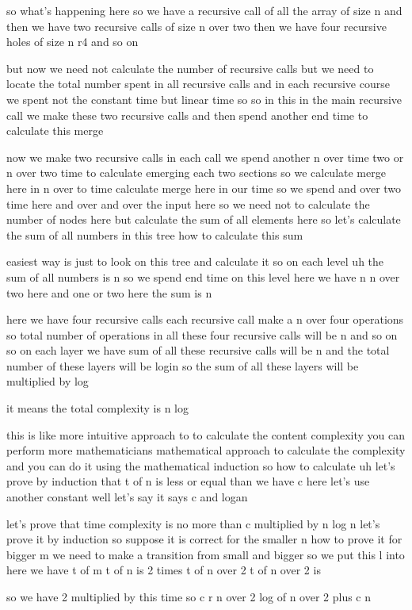 so what's happening here so we have a recursive call of all the array of size n and then we have two recursive calls of size n over two then we have four recursive holes of size n r4 and so on

but now we need not calculate the number of recursive calls but we need to locate the total number spent in all recursive calls and in each recursive course we spent not the constant time but linear time so so in this in the main recursive call we make these two recursive calls and then spend another end time to calculate this merge

now we make two recursive calls in each call we spend another n over time two or n over two time to calculate emerging each two sections so we calculate merge here in n over to time calculate merge here in our time so we spend and over two time here and over and over the input here so we need not to calculate the number of nodes here but calculate the sum of all elements here so let's calculate the sum of all numbers in this tree how to calculate this sum

easiest way is just to look on this tree and calculate it so on each level uh the sum of all numbers is n so we spend end time on this level here we have n n over two here and one or two here the sum is n

here we have four recursive calls each recursive call make a n over four operations so total number of operations in all these four recursive calls will be n and so on so on each layer we have sum of all these recursive calls will be n and the total number of these layers will be login so the sum of all these layers will be multiplied by log

it means the total complexity is n log

this is like more intuitive approach to to calculate the content complexity you can perform more mathematicians mathematical approach to calculate the complexity and you can do it using the mathematical induction so how to calculate uh let's prove by induction that t of n is less or equal than we have c here let's use another constant well let's say it says c and logan

let's prove that time complexity is no more than c multiplied by n log n let's prove it by induction so suppose it is correct for the smaller n how to prove it for bigger m we need to make a transition from small and bigger so we put this l into here we have t of m t of n is 2 times t of n over 2 t of n over 2 is

so we have 2 multiplied by this time so c r n over 2 log of n over 2 plus c n


